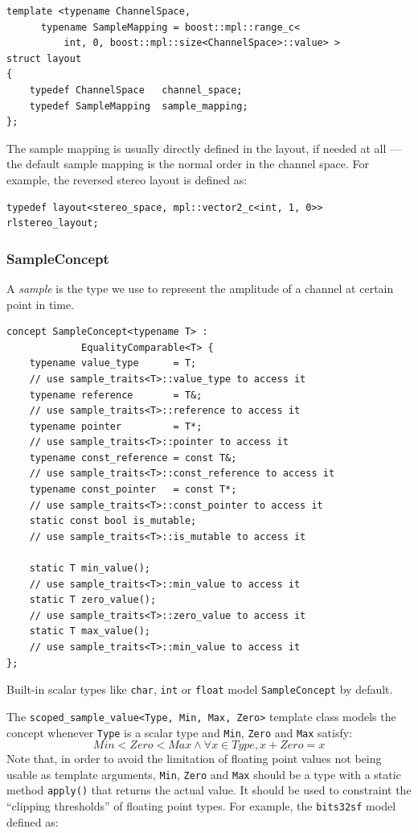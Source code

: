 \begin{lstlisting}
template <typename ChannelSpace,
	  typename SampleMapping = boost::mpl::range_c<
	      int, 0, boost::mpl::size<ChannelSpace>::value> >
struct layout
{
    typedef ChannelSpace   channel_space;
    typedef SampleMapping  sample_mapping;
};
\end{lstlisting}

The sample mapping is usually directly defined in the layout, if
needed at all --- the default sample mapping is the normal order in
the channel space. For example, the reversed stereo layout is defined
as:

\begin{lstlisting}
typedef layout<stereo_space, mpl::vector2_c<int, 1, 0>> rlstereo_layout;
\end{lstlisting}

\subsubsection{{SampleConcept}}

A \emph{sample} is the type we use to represent the amplitude of a
channel at certain point in time.

\begin{lstlisting}
concept SampleConcept<typename T> :
             EqualityComparable<T> {
    typename value_type      = T;
    // use sample_traits<T>::value_type to access it
    typename reference       = T&;
    // use sample_traits<T>::reference to access it
    typename pointer         = T*;
    // use sample_traits<T>::pointer to access it
    typename const_reference = const T&;
    // use sample_traits<T>::const_reference to access it
    typename const_pointer   = const T*;
    // use sample_traits<T>::const_pointer to access it
    static const bool is_mutable;
    // use sample_traits<T>::is_mutable to access it

    static T min_value(); 
    // use sample_traits<T>::min_value to access it
    static T zero_value(); 
    // use sample_traits<T>::zero_value to access it
    static T max_value(); 
    // use sample_traits<T>::min_value to access it
};
\end{lstlisting}

Built-in scalar types like \texttt{char}, \texttt{int} or
\texttt{float} model \texttt{Sample\-Concept} by default. 

The \texttt{scoped\_sample\_value<Type, Min, Max, Zero>} template
class models the concept whenever \texttt{Type} is a scalar type and
\texttt{Min}, \texttt{Zero} and \texttt{Max} satisfy:
\begin{equation}
Min < Zero < Max \land \forall x \in Type, x + Zero = x
\end{equation}
Note that, in order to avoid the limitation of floating point values
not being usable as template arguments, \texttt{Min}, \texttt{Zero}
and \texttt{Max} should be a type with a static method
\texttt{apply()} that returns the actual value. It should be used to
constraint the ``clipping thresholds'' of floating point types. For
example, the \texttt{bits32sf} model defined as:

